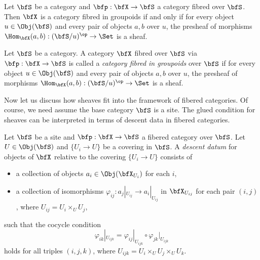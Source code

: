     \begin{proposition}%
        Let \(\bfS\) be a category and \(\bfp: \bfX \to \bfS\) a category fibred over \(\bfS\).
        Then \(\bfX\) is a category fibred in groupoids if and only if for every object \(u \in \Obj(\bfS)\) and every pair of objects \(a,b\) over \(u\), the presheaf of morphisms \(\Hom_{\bfX}(a,b): (\bfS/u)^{\op} \to \Set\) is a sheaf.
    \end{proposition}

    \begin{definition}%
        Let \(\bfS\) be a category.
        A category \(\bfX\) fibred over \(\bfS\) via \(\bfp: \bfX \to \bfS\) is called a \emph{category fibred in groupoids} over \(\bfS\) if for every object \(u \in \Obj(\bfS)\) and every pair of objects \(a,b\) over \(u\), the presheaf of morphisms \(\Hom_{\bfX}(a,b): (\bfS/u)^{\op} \to \Set\) is a sheaf.
    \end{definition}


    Now let us discuss how sheaves fit into the framework of fibered categories.
    Of course, we need assume the base category \(\bfS\) is a site.
    The glued condition for sheaves can be interpreted in terms of descent data in fibered categories.

    \begin{definition}%
        Let \(\bfS\) be a site and \(\bfp: \bfX \to \bfS\) a fibered category over \(\bfS\).
        Let \(U \in \Obj(\bfS)\) and \(\{ U_i \to U \}\) be a covering in \(\bfS\).
        A \emph{descent datum} for objects of \(\bfX\) relative to the covering \(\{ U_i \to U \}\) consists of
        \begin{itemize}
            \item a collection of objects \(a_i \in \Obj(\bfX_{U_i})\) for each \(i\),
            \item a collection of isomorphisms \(\varphi_{ij}: a_j|_{U_{ij}} \to a_i|_{U_{ij}}\) in \(\bfX_{U_{ij}}\) for each pair \((i,j)\), where \(U_{ij} = U_i \times_U U_j\),
        \end{itemize}
        such that the cocycle condition
        \[ \varphi_{ik}|_{U_{ijk}} = \varphi_{ij}|_{U_{ijk}} \circ \varphi_{jk}|_{U_{ijk}} \]
        holds for all triples \((i,j,k)\), where \(U_{ijk} = U_i \times_U U_j \times_U U_k\).
    \end{definition}

